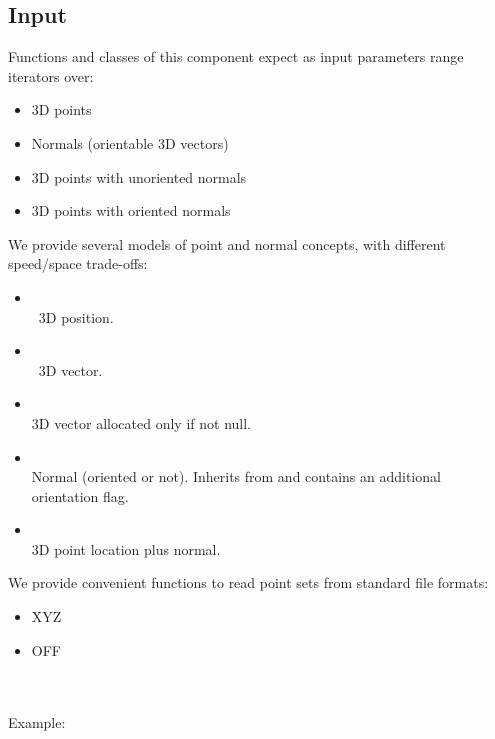 \subsection{Input}

Functions and classes of this component expect as input parameters range iterators over:

\begin{itemize}
\item 3D points
\item Normals (orientable 3D vectors)
\item 3D points with unoriented normals
\item 3D points with oriented normals
\end{itemize}

We provide several models of point and normal concepts, with different speed/space trade-offs:

\begin{itemize}
\item {} \\
\cgal\ 3D position.
\item {} \\
\cgal\ 3D vector.
\item {} \\
3D vector allocated only if not null.
\item {} \\
Normal (oriented or not). Inherits from  and contains an additional orientation flag.
\item {} \\
3D point location plus normal.
\end{itemize}

We provide convenient functions to read point sets from standard file formats:

\begin{itemize}
\item XYZ
\item OFF
\end{itemize}

  \\
  \\

Example:

